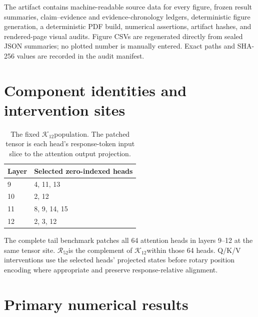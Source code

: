 \documentclass[10pt,twocolumn]{article}
\newcommand{\K}{\ensuremath{\mathcal{K}_{12}}}
\newcommand{\R}{\ensuremath{\mathcal{R}_{52}}}
\begin{document}
The artifact contains machine-readable source data for every figure, frozen result summaries, claim--evidence and evidence-chronology ledgers, deterministic figure generation, a deterministic PDF build, numerical assertions, artifact hashes, and rendered-page visual audits. Figure CSVs are regenerated directly from sealed JSON summaries; no plotted number is manually entered. Exact paths and SHA-256 values are recorded in the audit manifest.




\appendix
\section{Component identities and intervention sites}
\label{app:components}

\begin{table}[ht]
\centering
\small
\begin{tabular}{ll}
\toprule
Layer & Selected zero-indexed heads \\
\midrule
9 & 4, 11, 13 \\
10 & 2, 12 \\
11 & 8, 9, 14, 15 \\
12 & 2, 3, 12 \\
\bottomrule
\end{tabular}
\caption{The fixed \K population. The patched tensor is each head's response-token input slice to the attention output projection.}
\end{table}

The complete tail benchmark patches all 64 attention heads in layers 9--12 at the same tensor site. \R is the complement of \K within those 64 heads. Q/K/V interventions use the selected heads' projected states before rotary position encoding where appropriate and preserve response-relative alignment.

\section{Primary numerical results}
\end{document}
